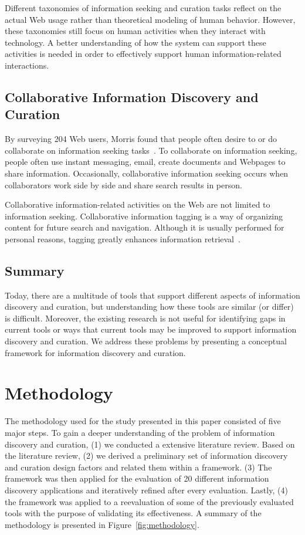 \documentclass{sigchi}
\begin{document}
Different taxonomies of information seeking and curation tasks reflect on the actual Web usage rather than theoretical modeling of human behavior. However, these taxonomies still focus on human activities when they interact with technology. A better understanding of how the system can support these activities is needed in order to effectively support human information-related interactions. 

\subsection{Collaborative Information Discovery and Curation}
By surveying 204 Web users, Morris found that people often desire to or do collaborate on information seeking tasks~\cite{morris2008survey}. To collaborate on information seeking, people often use instant messaging, email, create documents and Webpages to share information. Occasionally, collaborative information seeking occurs when collaborators work side by side and share search results in person.

Collaborative information-related activities on the Web are not limited to information seeking. Collaborative information tagging is a way of organizing content for future search and navigation. Although it is usually performed for personal reasons, tagging greatly enhances information retrieval~\cite{golder2006usage}.

\subsection{Summary}
Today, there are a multitude of tools that support different aspects of information discovery and curation, but understanding how these tools are similar (or differ) is difficult. Moreover, the existing research is not useful for identifying gaps in current tools or ways that current tools may be improved to support information discovery and curation. We address these problems by presenting a conceptual framework for information discovery and curation.

\section{Methodology}
\label{section:methodology}
The methodology used for the study presented in this paper consisted of five major steps. To gain a deeper understanding of the problem of information discovery and curation, (1) we conducted a extensive literature review. Based on the literature review, (2) we derived a preliminary set of information discovery and curation design factors and related them within a framework. (3) The framework was then applied for the evaluation of 20 different information discovery applications and iteratively refined after every evaluation. Lastly, (4) the framework was applied to a reevaluation of some of the previously evaluated tools with the purpose of validating its effectiveness.  A summary of the methodology is presented in Figure~\ref{fig:methodology}.
\end{document}
